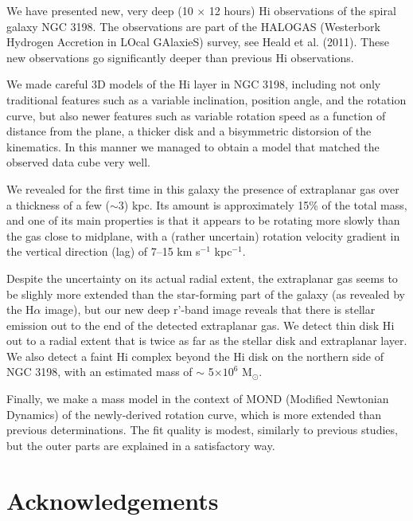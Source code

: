 \documentclass[traditabstract]{aa}
\begin{document}
We have presented new, very deep (10 $\times$ 12 hours) H{\sc i} observations of
the spiral galaxy NGC 3198. The observations are part of the HALOGAS
(Westerbork Hydrogen Accretion in LOcal GAlaxieS) survey, see Heald et
al. (2011). These new observations go significantly deeper than
previous H{\sc i} observations. 

We made careful 3D models
of the H{\sc i} layer in NGC 3198, including not only traditional features such as a
variable inclination, position angle, and the rotation curve, but also newer features such as
variable rotation speed as a function of distance from the plane, a
thicker disk and a bisymmetric distorsion of the kinematics. In this
manner we managed to obtain a model that matched the observed data cube very well.

We revealed for the first time in this galaxy the presence of
extraplanar gas over a thickness of a few ($\sim 3$) kpc. Its amount is approximately
15\% of the total mass, 
and one of its main properties is that it appears to be rotating more
slowly than the gas close to midplane, with a (rather uncertain) rotation velocity
gradient in the vertical direction (lag) of 7--15 km s$^{-1}$ kpc$^{-1}$.

Despite the uncertainty on its actual radial extent, the extraplanar
gas seems to be slighly more extended than the star-forming part of
the galaxy (as revealed by the H$\alpha$ image), but our new deep r'-band
image reveals that there is stellar emission out to the end of the
detected extraplanar gas. We detect thin disk H{\sc i} out to a radial
extent that is twice as far as the stellar disk and extraplanar
layer. We also detect a faint H{\sc i} complex beyond the H{\sc i} disk on the
northern side of NGC 3198, with an estimated mass of $\sim$ 5$\times
10^6$ M$_{\odot}$. 

Finally, we make a mass model in the context of MOND (Modified
Newtonian Dynamics) of the newly-derived rotation curve, which is more
extended than previous determinations. The fit quality is modest,
similarly to previous studies, but the outer parts are explained in a
satisfactory way. 


\section*{Acknowledgements}
\end{document}
